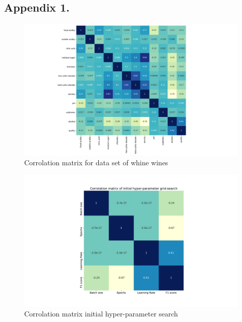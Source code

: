 \documentclass[%
oneside,                 %
final,                   %
10pt]{article}
\begin{document}
\begin{appendices}
\section*{Appendix 1.} \label{APP_1}
\begin{figure}[!h]
        \centering 
         \includegraphics[scale=0.45]{../Results/corrolation_X.pdf} 
        \caption{Corrolation matrix for data set of whine wines}
        \label{fig:corr_parameters}   
\end{figure}  

\begin{figure}[!h]
        \centering 
         \includegraphics[scale=0.4]{../Results/inital_hyperparam.pdf} 
        \caption{Corrolation matrix initial hyper-parameter search}
        \label{fig:corr_initial}   
\end{figure}  

\end{appendices}
\end{document}
